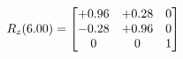 \documentclass[preview]{standalone}
\begin{document}
\begin{align*}
\special{dvisvgm:raw <g id='unique000'>}R_{z}(6.00) = \begin{bmatrix}+0.96 & +0.28 & 0 \\-0.28 & +0.96 & 0 \\0 & 0 & 1\end{bmatrix}\special{dvisvgm:raw </g>}
\end{align*}
\end{document}
